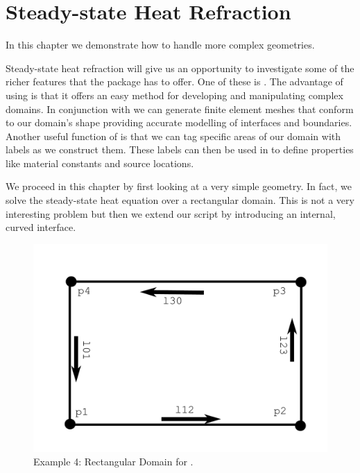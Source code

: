 
%
%
%

\section{Steady-state Heat Refraction}
\label{STEADY-STATE HEAT REFRACTION}

In this chapter we demonstrate how to handle more complex geometries. 

Steady-state heat refraction will give us an opportunity to investigate some of the richer features that the \esc package has to offer. One of these is \pycad . The advantage of using \pycad is that it offers an easy method for developing and manipulating complex domains. In conjunction with \gmsh we can generate finite element meshes that conform to our domain's shape providing accurate modelling of interfaces and boundaries. Another useful function of \pycad is that we can tag specific areas of our domain with labels as we construct them. These labels can then be used in \esc to define properties like material constants and source locations. 

We proceed in this chapter by first looking at a very simple geometry. In fact, we solve 
the steady-state heat equation over a rectangular domain. This is not a very interesting problem but then we extend our script by introducing an internal, curved interface.

\begin{figure}[ht]
\centerline{\includegraphics[width=4.in]{figures/pycadrec}}
\caption{Example 4: Rectangular Domain for \pycad.}
\label{fig:pycad rec}
\end{figure}

